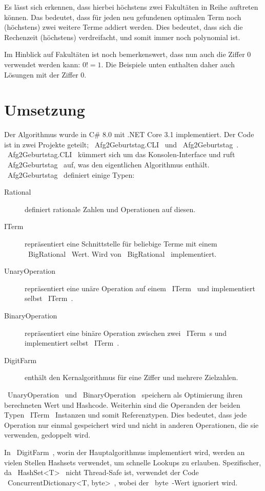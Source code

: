 \documentclass{article}
\theoremstyle{nonumberplain}
\begin{document}
Es lässt sich erkennen, dass hierbei höchstens zwei Fakultäten in Reihe auftreten können.
Das bedeutet, dass für jeden neu gefundenen optimalen Term noch (höchstens) zwei weitere Terme addiert werden.
Dies bedeutet, dass sich die Rechenzeit (höchstens) verdreifacht, und somit immer noch polynomial ist.

Im Hinblick auf Fakultäten ist noch bemerkenswert, dass nun auch die Ziffer \(0\) verwendet werden kann:
\(0! = 1\).
Die Beispiele unten enthalten daher auch Lösungen mit der Ziffer \(0\).

\section{Umsetzung}

Der Algorithmus wurde in C\# 8.0 mit .NET Core 3.1 implementiert.
Der Code ist in zwei Projekte geteilt;
~Afg2Geburtstag.CLI~ und ~Afg2Geburtstag~.
~Afg2Geburtstag.CLI~ kümmert sich um das Konsolen-Interface und ruft ~Afg2Geburtstag~ auf, was den eigentlichen Algorithmus enthält.
~Afg2Geburtstag~ definiert einige Typen:

\begin{description}
    \item[Rational] definiert rationale Zahlen und Operationen auf diesen.
    \item[ITerm] repräsentiert eine Schnittstelle für beliebige Terme mit einem ~BigRational~ Wert. Wird von ~BigRational~ implementiert.
    \item[UnaryOperation] repräsentiert eine unäre Operation auf einem ~ITerm~ und implementiert selbst ~ITerm~.
    \item[BinaryOperation] repräsentiert eine binäre Operation zwischen zwei ~ITerm~s und implementiert selbst ~ITerm~.
    \item[DigitFarm] enthält den Kernalgorithmus für eine Ziffer und mehrere Zielzahlen.
\end{description}

~UnaryOperation~ und ~BinaryOperation~ speichern als Optimierung ihren berechneten Wert und Hashcode.
Weiterhin sind die Operanden der beiden Typen ~ITerm~ Instanzen und somit Referenztypen.
Dies bedeutet, dass jede Operation nur einmal gespeichert wird und nicht in anderen Operationen, die sie verwenden, gedoppelt wird.

In ~DigitFarm~, worin der Hauptalgorithmus implementiert wird, werden an vielen Stellen Hashsets verwendet, um schnelle Lookups zu erlauben.
Spezifischer, da ~HashSet<T>~ nicht Thread-Safe ist, verwendet der Code ~ConcurrentDictionary<T, byte>~, wobei der ~byte~-Wert ignoriert wird.
\end{document}
